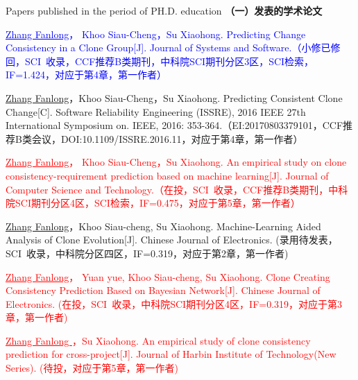 
 {Papers
published in the period of PH.D. education}
\noindent\textbf{（一）发表的学术论文}
\begin{publist}
\item
\textcolor{blue}{\underline{Zhang Fanlong}， Khoo Siau-Cheng，Su Xiaohong. Predicting Change Consistency in a Clone Group[J]. Journal of Systems and Software.（小修已修回，SCI~收录，CCF推荐B类期刊，中科院SCI期刊分区3区，SCI检索，IF=1.424，对应于第4章，第一作者）}

\item
\underline{Zhang Fanlong}，Khoo Siau-Cheng，Su Xiaohong. Predicting Consistent Clone Change[C]. Software Reliability Engineering (ISSRE), 2016 IEEE 27th International Symposium on. IEEE, 2016: 353-364.（EI:20170803379101，CCF推荐B类会议，DOI:10.1109/ISSRE.2016.11，对应于第4章，第一作者）

\item
\textcolor{red}{\underline{Zhang Fanlong}， Khoo Siau-Cheng，Su Xiaohong. An empirical study on clone consistency-requirement prediction based on machine learning[J]. Journal of Computer Science and Technology.（在投，SCI~收录，CCF推荐B类期刊，中科院SCI期刊分区4区，SCI检索，IF=0.475，对应于第5章，第一作者）}

\item
\underline{Zhang Fanlong}，Khoo Siau-cheng, Su Xiaohong. Machine-Learning Aided Analysis of Clone Evolution[J]. Chinese Journal of Electronics. (录用待发表，SCI~收录，中科院分区四区，IF=0.319，对应于第2章，第一作者)

\item
\textcolor{red}{\underline{Zhang Fanlong}， Yuan yue, Khoo Siau-cheng, Su Xiaohong. Clone Creating Consistency Prediction Based on Bayesian Network[J]. Chinese Journal of Electronics. (在投，SCI~收录，中科院SCI期刊分区4区，IF=0.319，对应于第3章，第一作者)}

\item
\textcolor{red}{\underline{Zhang Fanlong }，Su Xiaohong. An empirical study of clone consistency prediction for cross-project[J]. Journal of Harbin Institute of Technology(New Series). (待投，对应于第5章，第一作者)}



\end{publist}
